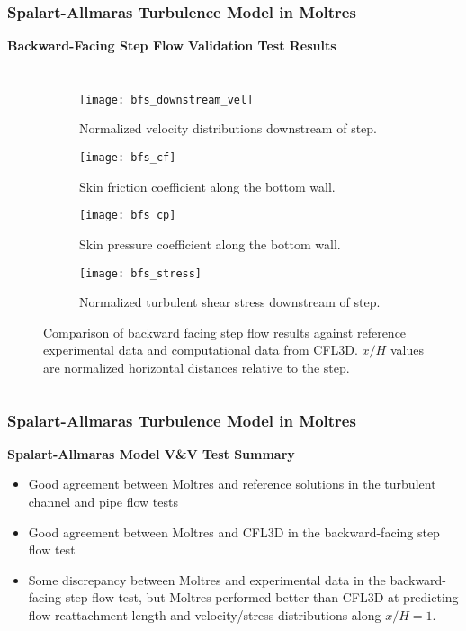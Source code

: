 \begin{frame}
  \frametitle{Spalart-Allmaras Turbulence Model in Moltres}
  \textbf{Backward-Facing Step Flow Validation Test Results}
  \begin{columns}
    \column{11cm}
  \begin{figure}[htb]
    \centering
    \hfill
    \begin{subfigure}[t]{0.24\columnwidth}
      \centering
      \texttt{[image: bfs\_downstream\_vel]}
      \caption{Normalized velocity distributions downstream of step.}
      \label{fig:bfs-downstream}
    \end{subfigure} %
    \hfill
    \begin{subfigure}[t]{0.24\columnwidth}
      \centering
      \texttt{[image: bfs\_cf]}
      \caption{Skin friction coefficient along the bottom wall.}
      \label{fig:bfs-cf}
    \end{subfigure}
    \hfill
    \begin{subfigure}[t]{0.24\columnwidth}
      \centering
      \texttt{[image: bfs\_cp]}
      \caption{Skin pressure coefficient along the bottom wall.}
      \label{fig:bfs-cp}
    \end{subfigure}%
    \begin{subfigure}[t]{0.24\columnwidth}
      \centering
      \texttt{[image: bfs\_stress]}
      \caption{Normalized turbulent shear stress downstream
      of step.}
      \label{fig:bfs-stress}
    \end{subfigure}
    \caption{Comparison of backward facing step flow results against reference
    experimental data and computational data from CFL3D. $x/H$ values are normalized horizontal
    distances relative to the step.}
    \label{fig:bfs-plots}
  \end{figure}
\end{columns}
\end{frame}

\begin{frame}
  \frametitle{Spalart-Allmaras Turbulence Model in Moltres}
  \begin{block}{\textbf{Spalart-Allmaras Model V\&V Test Summary}}
    \begin{itemize}
      \item Good agreement between Moltres and reference solutions in the turbulent channel and pipe
        flow tests
      \item Good agreement between Moltres and CFL3D in the backward-facing step flow test
      \item Some discrepancy between Moltres and experimental data in the backward-facing step flow
        test, but Moltres performed better than CFL3D at predicting flow reattachment length and
        velocity/stress distributions along $x/H=1$.
    \end{itemize}
  \end{block}
\end{frame}
